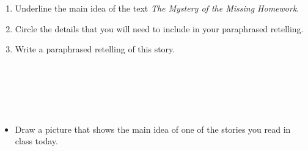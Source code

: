 \documentclass[12pt]{article}
\begin{document}
\begin{tcolorbox}[colframe=black!60, colback=white, 
coltitle=black, colbacktitle=black!15, fonttitle=\bfseries\Large, 
title=Independent Practice, halign title=center, left=10pt, right=10pt, top=10pt, bottom=15pt]

\begin{enumerate}[itemsep=3em] %
    \item Underline the main idea of the text \textit{The Mystery of the Missing Homework}.

   
    \item Circle the details that you will need to include in your paraphrased retelling.
    \item Write a paraphrased retelling of this story.
\\[0.8cm] \underline{\hspace{15cm}}  
    \\[0.8cm] \underline{\hspace{15cm}}  
    \\[0.8cm] \underline{\hspace{15cm}} 
\\[0.8cm] \underline{\hspace{15cm}}  
    \\[0.8cm] \underline{\hspace{15cm}}  
    \\[0.8cm] \underline{\hspace{15cm}} 


\end{enumerate}
\vspace{1em}
\end{tcolorbox}


\vspace{1em}

\begin{tcolorbox}[colframe=black!60, colback=white, 
coltitle=black, colbacktitle=black!15, fonttitle=\bfseries\Large, 
title=Exit Ticket, halign title=center, left=10pt, right=10pt, top=10pt, bottom=15pt]

\begin{itemize}
    \item Draw a picture that shows the main idea of one of the stories you read in class today.
\vspace{15em}

\end{itemize}
\end{tcolorbox}
\end{document}
